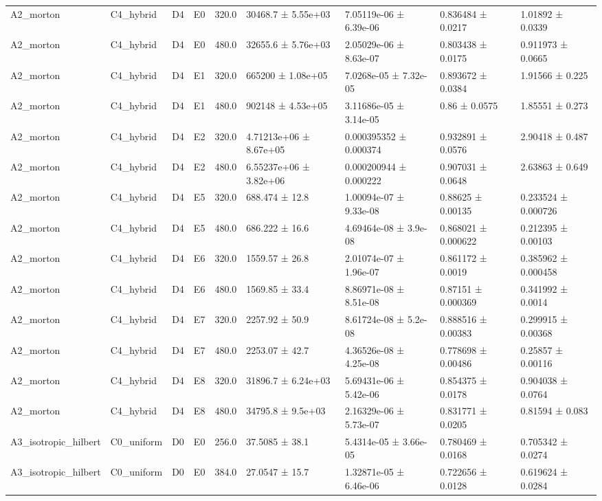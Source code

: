 \begin{table}
\begin{tabular}{lllllllll}
A2\_morton & C4\_hybrid & D4 & E0 & 320.0 & 30468.7 ± 5.55e+03 & 7.05119e-06 ± 6.39e-06 & 0.836484 ± 0.0217 & 1.01892 ± 0.0339 \\
A2\_morton & C4\_hybrid & D4 & E0 & 480.0 & 32655.6 ± 5.76e+03 & 2.05029e-06 ± 8.63e-07 & 0.803438 ± 0.0175 & 0.911973 ± 0.0665 \\
A2\_morton & C4\_hybrid & D4 & E1 & 320.0 & 665200 ± 1.08e+05 & 7.0268e-05 ± 7.32e-05 & 0.893672 ± 0.0384 & 1.91566 ± 0.225 \\
A2\_morton & C4\_hybrid & D4 & E1 & 480.0 & 902148 ± 4.53e+05 & 3.11686e-05 ± 3.14e-05 & 0.86 ± 0.0575 & 1.85551 ± 0.273 \\
A2\_morton & C4\_hybrid & D4 & E2 & 320.0 & 4.71213e+06 ± 8.67e+05 & 0.000395352 ± 0.000374 & 0.932891 ± 0.0576 & 2.90418 ± 0.487 \\
A2\_morton & C4\_hybrid & D4 & E2 & 480.0 & 6.55237e+06 ± 3.82e+06 & 0.000200944 ± 0.000222 & 0.907031 ± 0.0648 & 2.63863 ± 0.649 \\
A2\_morton & C4\_hybrid & D4 & E5 & 320.0 & 688.474 ± 12.8 & 1.00094e-07 ± 9.33e-08 & 0.88625 ± 0.00135 & 0.233524 ± 0.000726 \\
A2\_morton & C4\_hybrid & D4 & E5 & 480.0 & 686.222 ± 16.6 & 4.69464e-08 ± 3.9e-08 & 0.868021 ± 0.000622 & 0.212395 ± 0.00103 \\
A2\_morton & C4\_hybrid & D4 & E6 & 320.0 & 1559.57 ± 26.8 & 2.01074e-07 ± 1.96e-07 & 0.861172 ± 0.0019 & 0.385962 ± 0.000458 \\
A2\_morton & C4\_hybrid & D4 & E6 & 480.0 & 1569.85 ± 33.4 & 8.86971e-08 ± 8.51e-08 & 0.87151 ± 0.000369 & 0.341992 ± 0.0014 \\
A2\_morton & C4\_hybrid & D4 & E7 & 320.0 & 2257.92 ± 50.9 & 8.61724e-08 ± 5.2e-08 & 0.888516 ± 0.00383 & 0.299915 ± 0.00368 \\
A2\_morton & C4\_hybrid & D4 & E7 & 480.0 & 2253.07 ± 42.7 & 4.36526e-08 ± 4.25e-08 & 0.778698 ± 0.00486 & 0.25857 ± 0.00116 \\
A2\_morton & C4\_hybrid & D4 & E8 & 320.0 & 31896.7 ± 6.24e+03 & 5.69431e-06 ± 5.42e-06 & 0.854375 ± 0.0178 & 0.904038 ± 0.0764 \\
A2\_morton & C4\_hybrid & D4 & E8 & 480.0 & 34795.8 ± 9.5e+03 & 2.16329e-06 ± 5.73e-07 & 0.831771 ± 0.0205 & 0.81594 ± 0.083 \\
A3\_isotropic\_hilbert & C0\_uniform & D0 & E0 & 256.0 & 37.5085 ± 38.1 & 5.4314e-05 ± 3.66e-05 & 0.780469 ± 0.0168 & 0.705342 ± 0.0274 \\
A3\_isotropic\_hilbert & C0\_uniform & D0 & E0 & 384.0 & 27.0547 ± 15.7 & 1.32871e-05 ± 6.46e-06 & 0.722656 ± 0.0128 & 0.619624 ± 0.0284 \\

\end{tabular}
\end{table}
